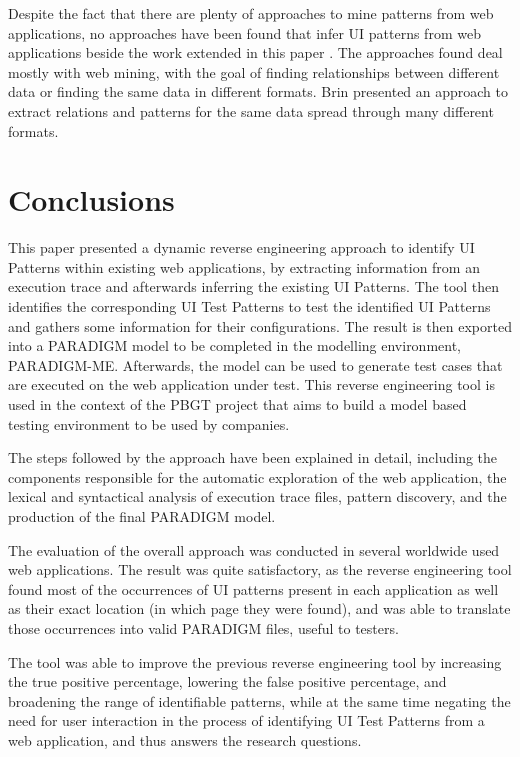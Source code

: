 \documentclass[10pt, conference, compsocconf]{IEEEtran}
\begin{document}
Despite the fact that there are plenty of approaches to mine patterns from web applications, no approaches have been found that infer UI patterns from web applications beside the work extended in this paper \cite{nabuco2013inferring, morgado2012gui}. The approaches found deal mostly with web mining, with the goal of finding relationships between different data or finding the same data in different formats. Brin \cite{brin1999extracting} presented an approach to extract relations and patterns for the same data spread through many different formats. %

\section{Conclusions}\label{sec:conc}

This paper presented a dynamic reverse engineering approach to identify UI Patterns within existing web applications, by extracting information from an execution trace and afterwards inferring the existing UI Patterns. The tool then identifies the corresponding UI Test Patterns to test the identified UI Patterns and gathers some information for their configurations. The result is then exported into a PARADIGM model to be completed in the modelling environment, PARADIGM-ME. Afterwards, the model can be used to generate test cases that are executed on the web application under test. This reverse engineering
tool is used in the context of the PBGT project that aims
to build a model based testing environment to be used by
companies.

The steps followed by the approach have been explained in detail, including the components responsible for the automatic exploration of the web application, the lexical and syntactical analysis of execution trace files, pattern discovery, and the production of the final PARADIGM model.

The evaluation of the overall approach was conducted in several worldwide used web applications. The result was quite satisfactory, as the reverse engineering tool found most of the occurrences of UI patterns present in each application as well as their exact location (in which page they were found), and was able to translate those occurrences into valid PARADIGM files, useful to testers. 

The tool was able to improve the previous reverse engineering tool by increasing the true positive percentage, lowering the false positive percentage, and broadening the range of identifiable patterns, while at the same time negating the need for user interaction in the process of identifying UI Test Patterns from a web application, and thus answers the research questions.
\end{document}
